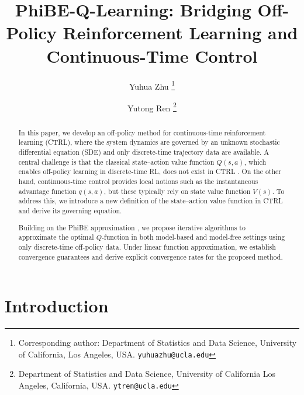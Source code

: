 \documentclass[12pt]{article}
\title{PhiBE-Q-Learning: Bridging Off-Policy Reinforcement Learning and Continuous-Time Control}
\author{
Yuhua Zhu \thanks{Corresponding author: Department of Statistics and Data Science, University of California, Los Angeles, USA. \texttt{yuhuazhu@ucla.edu}}
\and
Yutong Ren \thanks{Department of Statistics and Data Science, University of California Los Angeles, California, USA. \texttt{ytren@ucla.edu}}
}
\date{}
\def\tcr{\textcolor{black}}
\def\tcr{\textcolor{red}}
\begin{document}
\maketitle
\begin{abstract}
In this paper, we develop an off-policy method for continuous-time reinforcement learning (CTRL), where the system dynamics are governed by an unknown stochastic differential equation (SDE) and only discrete-time trajectory data are available. 
A central challenge is that the classical state--action value function $Q(s,a)$, which enables off-policy learning in discrete-time RL, does not exist in CTRL \citep{tallec2019making, jia2023q, baird1994reinforcement}. On the other hand, continuous-time control provides local notions such as the instantaneous advantage function $q(s,a)$, but these typically rely on state value function $V(s)$. To address this, we introduce a new definition of the state--action value function in CTRL and derive its governing equation.

Building on the PhiBE approximation \citep{zhu2024phibe,zhu2025optimal}, we propose iterative algorithms to approximate the optimal $Q$-function in both model-based and model-free settings using only discrete-time off-policy data. Under linear function approximation, we establish convergence guarantees and derive explicit convergence rates for the proposed method.
\end{abstract}



\section{Introduction}





\end{document}
